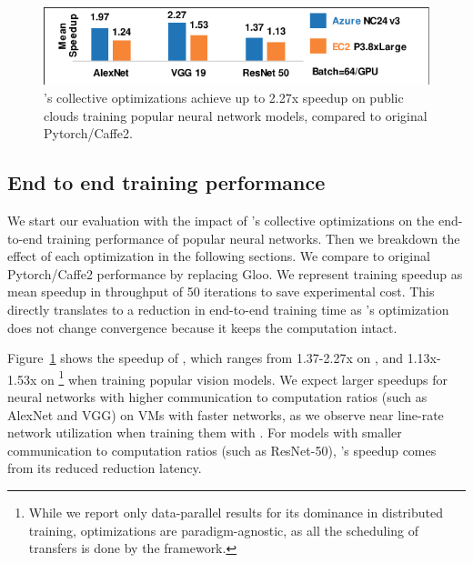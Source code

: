 
\begin{figure}[t!]
	\centering
	\includegraphics[width=.7\linewidth, trim=2 1 1 3,clip]{Figures/end2end.pdf}
	\caption{\plink{}'s collective optimizations achieve up to 2.27x speedup on  public clouds training popular neural network models, compared to original Pytorch/Caffe2.}
	\label{fig:end2end}
\end{figure}


\subsection{End to end training performance}
We start our evaluation with the impact of \plink{}'s collective optimizations on the end-to-end training performance of popular neural networks. Then we breakdown the effect of each optimization in the following sections. We compare \plink{} to original Pytorch/Caffe2 performance by replacing Gloo. We represent training speedup as mean speedup in throughput of 50 iterations to save experimental cost. This directly translates to a reduction in end-to-end training time as \plink{}'s optimization does not change convergence because it keeps the computation intact. %

Figure~\ref{fig:end2end} shows the speedup of \plink, which ranges from 1.37-2.27x on \azure, and 1.13x-1.53x on \ectwo\footnote{While we report only data-parallel results for its dominance in distributed training, \plink optimizations are paradigm-agnostic, as all the scheduling of transfers is done by the framework.} when training popular vision models. We expect larger speedups for neural networks with higher communication to computation ratios (such as AlexNet and VGG) on VMs with faster networks, as we observe near line-rate network utilization when training them with \plink. For models with smaller communication to computation ratios (such as ResNet-50), \plink{}'s speedup comes from its reduced reduction latency.

